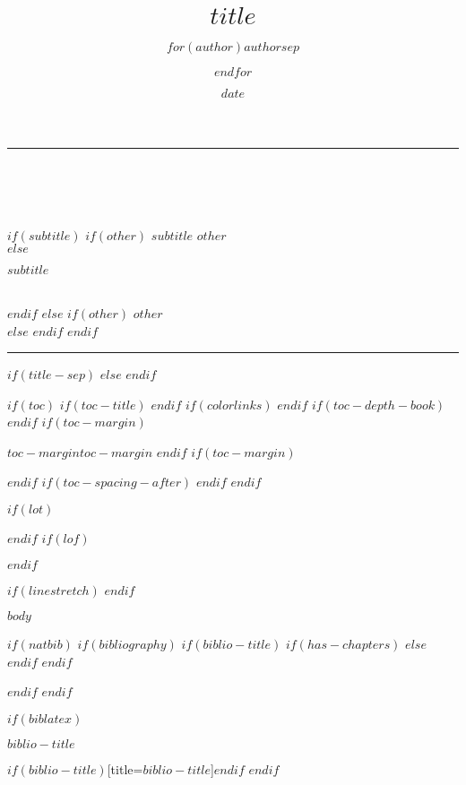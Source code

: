 \documentclass[
  $if(fontsize)$
    $fontsize$,
  $endif$
  $if(lang)$
    $babel-lang$,
  $endif$
  $if(papersize)$
    $papersize$paper,
  $endif$
  $if(beamer)$
    ignorenonframetext,
  $if(handout)$
    handout,
  $endif$
  $if(aspectratio)$
    aspectratio=$aspectratio$,
  $endif$
  $endif$
  $for(classoption)$
    $classoption$$sep$,
  $endfor$
]{$if(documentclass)$$documentclass$$else$article$endif$}
\title{$title$}
\author{$for(author)$$author$$sep$ \and $endfor$}
\date{$date$}
\makeatletter
\renewcommand{\maketitle}{%
    \noindent\rule{\textwidth}{1.5pt}\\[7pt]
    {\large \@author \hfill \@date} \\[0.75\baselineskip]
    {\LARGE\centerline{\textbf{\@title}}} \\[0.75\baselineskip]
    $if(subtitle)$
      $if(other)$
        {\normalsize $subtitle$ \hfill $other$} \\
      $else$
        {\normalsize \centerline{$subtitle$}} \\
      $endif$
    $else$
      $if(other)$
        {\normalsize \null\hfill $other$} \\
      $else$
      $endif$
    $endif$
    \rule{\textwidth}{1.5pt}
}
\makeatother
\begin{document}
\maketitle

$if(title-sep)$
  \vspace{$title-sep$}
$else$
  \vspace{2em}
$endif$

$if(toc)$
  $if(toc-title)$
    \renewcommand*\contentsname{
      $if(toc-title-spacing)$
        \vspace{$toc-title-spacing$}
      $endif$
      $toc-title$
      $if(toc-title-spacing)$
        \vspace{$toc-title-spacing$}
      $endif$
    }
  $endif$
  $if(colorlinks)$
    \hypersetup{linktoc=page}
  $endif$
  $if(toc-depth-book)$
    \setcounter{tocdepth}{$toc-depth-book$}
  $endif$
  $if(toc-margin)$
    \begin{adjustwidth}{$toc-margin$}{$toc-margin$}
  $endif$
  \tableofcontents
  $if(toc-margin)$
    \end{adjustwidth}
  $endif$
  $if(toc-spacing-after)$
    \vspace{$toc-spacing-after$}
  $endif$
$endif$

$if(lot)$
  \listoftables
$endif$
$if(lof)$
  \listoffigures
$endif$

$if(linestretch)$
$endif$

$body$

$if(natbib)$
  $if(bibliography)$
    $if(biblio-title)$
      $if(has-chapters)$
        \renewcommand\bibname{$biblio-title$}
      $else$
        \renewcommand\refname{$biblio-title$}
      $endif$
    $endif$
    \newpage
    
  $endif$
$endif$

$if(biblatex)$
  \begin{frame}[allowframebreaks]{$biblio-title$}
    \bibliographytrue
    \printbibliography[heading=none]
  \end{frame}
  \printbibliography$if(biblio-title)$[title=$biblio-title$]$endif$
$endif$
\end{document}
